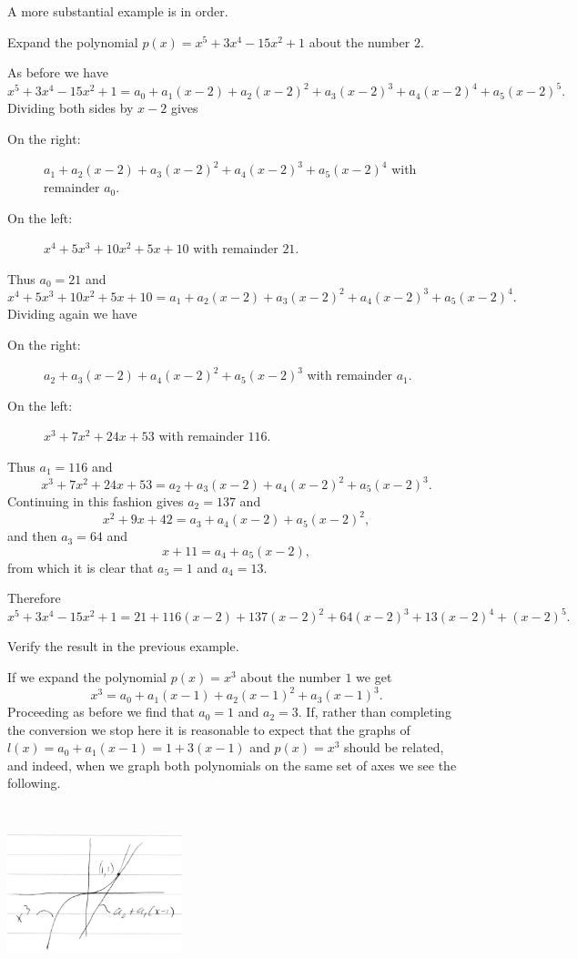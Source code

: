 A more substantial example is in order.
\begin{myexample}
  Expand the polynomial $p(x) = x^5+3x^4-15x^2+1$ about the number
  $2.$

  As before we have 
$$
x^5+3x^4-15x^2+1 =
a_0+a_1(x-2)+a_2(x-2)^2+a_3(x-2)^3+a_4(x-2)^4+a_5(x-2)^5.
$$
Dividing both sides by $x-2$ gives
\begin{description}
\item[\sc{}On the right:]
  $a_1+a_2(x-2)+a_3(x-2)^2+a_4(x-2)^3+a_5(x-2)^4$ with remainder $a_0.$
\item[\sc{}On the left:] $x^4+5x^3+10x^2+5x+10$ with remainder $21.$
\end{description}
Thus $a_0 = 21$ and 
$$
x^4+5x^3+10x^2+5x+10 = a_1+a_2(x-2)+a_3(x-2)^2+a_4(x-2)^3+a_5(x-2)^4.
$$
Dividing again we have
\begin{description}
\item[\sc{}On the right:] $a_2+a_3(x-2)+a_4(x-2)^2+a_5(x-2)^3$ with
  remainder $a_1.$
\item[\sc{}On the left:] $x^3+7x^2+24x+53$ with remainder $116.$
\end{description}
Thus $a_1=116$ and 
$$
x^3+7x^2+24x+53 = a_2+a_3(x-2)+a_4(x-2)^2+a_5(x-2)^3.
$$
Continuing in this fashion gives $a_2= 137$ and
$$
x^2+9x+42 = a_3+a_4(x-2)+a_5(x-2)^2,
$$
and then $a_3=64$ and 
$$
x+11 = a_4+a_5(x-2),
$$
from which it is clear that $a_5= 1$ and $a_4=13.$

Therefore
$$
x^5+3x^4-15x^2+1 =
21+116(x-2)+137(x-2)^2+64(x-2)^3+13(x-2)^4+(x-2)^5.
$$
\end{myexample}
\begin{embeddedproblem}{}
  Verify the result in the previous example.
\end{embeddedproblem}

If we expand the polynomial $p(x) = x^3$ about the number $1$ we get
$$ 
x^3 = a_0+a_1(x-1) +a_2(x-1)^2+a_3(x-1)^3.
$$
Proceeding as before we find that $a_0=1$ and $a_2= 3.$ If, rather
than completing the conversion we stop here it is reasonable to expect
that the graphs of $l(x) = a_0+a_1(x-1) = 1+3(x-1)$ and $p(x) = x^3$
should be related, and indeed, when we graph both polynomials on the
same set of axes we see the following.\\
\centerline{\includegraphics*[height=2in,width=2in]{Figures/LinearTaylor}}

